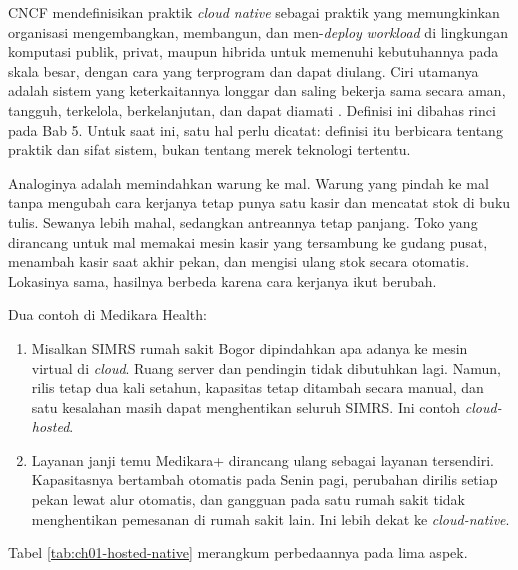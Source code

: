 CNCF mendefinisikan praktik \textit{cloud native} sebagai praktik yang memungkinkan
organisasi mengembangkan, membangun, dan men-\textit{deploy} \textit{workload} di
lingkungan komputasi publik, privat, maupun hibrida untuk memenuhi kebutuhannya pada
skala besar, dengan cara yang terprogram dan dapat diulang. Ciri utamanya adalah sistem
yang keterkaitannya longgar dan saling bekerja sama secara aman, tangguh, terkelola,
berkelanjutan, dan dapat diamati \cite{cncf-definition}. Definisi ini dibahas rinci
pada Bab 5. Untuk saat ini, satu hal perlu dicatat: definisi itu berbicara tentang
praktik dan sifat sistem, bukan tentang merek teknologi tertentu.

Analoginya adalah memindahkan warung ke mal. Warung yang pindah ke mal tanpa mengubah
cara kerjanya tetap punya satu kasir dan mencatat stok di buku tulis. Sewanya lebih
mahal, sedangkan antreannya tetap panjang. Toko yang dirancang untuk mal memakai mesin
kasir yang tersambung ke gudang pusat, menambah kasir saat akhir pekan, dan mengisi
ulang stok secara otomatis. Lokasinya sama, hasilnya berbeda karena cara kerjanya ikut
berubah.

Dua contoh di Medikara Health:
\begin{enumerate}
  \item Misalkan SIMRS rumah sakit Bogor dipindahkan apa adanya ke mesin virtual di
        \textit{cloud}. Ruang server dan pendingin tidak dibutuhkan lagi. Namun, rilis
        tetap dua kali setahun, kapasitas tetap ditambah secara manual, dan satu
        kesalahan masih dapat menghentikan seluruh SIMRS. Ini contoh
        \textit{cloud-hosted}.
  \item Layanan janji temu Medikara+ dirancang ulang sebagai layanan tersendiri.
        Kapasitasnya bertambah otomatis pada Senin pagi, perubahan dirilis setiap pekan
        lewat alur otomatis, dan gangguan pada satu rumah sakit tidak menghentikan
        pemesanan di rumah sakit lain. Ini lebih dekat ke \textit{cloud-native}.
\end{enumerate}

Tabel \ref{tab:ch01-hosted-native} merangkum perbedaannya pada lima aspek.

